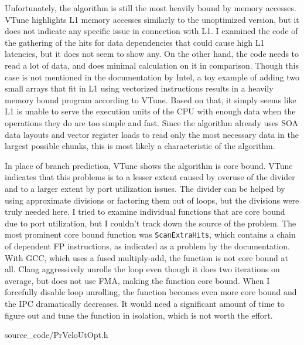 \documentclass[12pt]{article}
\newcommand{\code}[1]{\texttt{#1}}
\begin{document}
\vspace{1pc}

Unfortunately, the algorithm is still the most heavily bound by memory accesses. VTune highlights L1 memory accesses similarly to the unoptimized version, but it does not indicate any specific issue in connection with L1. I examined the code of the gathering of the hits for data dependencies that could cause high L1 latencies, but it does not seem to show any. On the other hand, the code needs to read a lot of data, and does minimal calculation on it in comparison. Though this case is not mentioned in the documentation by Intel, a toy example of adding two small arrays that fit in L1 using vectorized instructions results in a heavily memory bound program according to VTune. Based on that, it simply seems like L1 is unable to serve the execution units of the CPU with enough data when the operations they do are too simple and fast. Since the algorithm already uses SOA data layouts and vector register loads to read only the most necessary data in the largest possible chunks, this is most likely a characteristic of the algorithm.

\vspace{1pc}

In place of branch prediction, VTune shows the algorithm is core bound. VTune indicates that this problems is to a lesser extent caused by overuse of the divider and to a larger extent by port utilization issues. The divider can be helped by using approximate divisions or factoring them out of loops, but the divisions were truly needed here. I tried to examine individual functions that are core bound due to port utilization, but I couldn't track down the source of the problem. The most prominent core bound function was \code{ScanExtraHits}, which contains a chain of dependent FP instructions, as indicated as a problem by the documentation\cite{intel_vtune_docs}. With GCC, which uses a fused multiply-add, the function is not core bound at all. Clang aggressively unrolls the loop even though it does two iterations on average, but does not use FMA, making the function core bound. When I forcefully disable loop unrolling, the function becomes even more core bound and the IPC dramatically decreases. It would need a significant amount of time to figure out and tune the function in isolation, which is not worth the effort.


	{source_code/PrVeloUtOpt.h}
\end{document}
